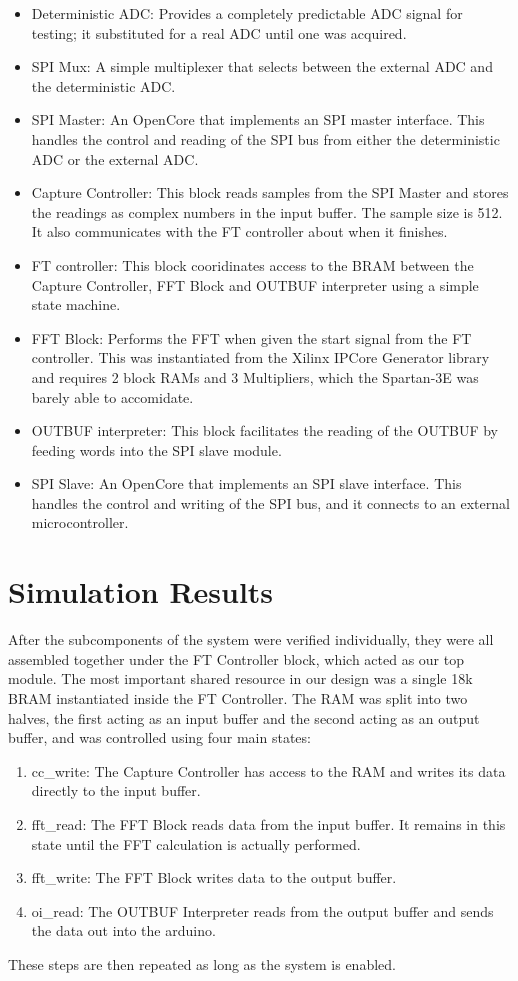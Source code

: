 \documentclass[12pt]{article}
\begin{document}
    \begin{itemize}
      \item Deterministic ADC: Provides a completely predictable ADC signal for testing; it substituted for a real ADC until one was acquired.
      \item SPI Mux: A simple multiplexer that selects between the external ADC and the deterministic ADC.
      \item SPI Master: An OpenCore that implements an SPI master interface. This handles the control and reading of the SPI bus from either the deterministic ADC or the external ADC.
      \item Capture Controller: This block reads samples from the SPI Master and stores the readings as complex numbers in the input buffer. The sample size is 512. It also communicates with the FT controller about when it finishes.
      \item FT controller: This block cooridinates access to the BRAM between the Capture Controller, FFT Block and OUTBUF interpreter using a simple state machine.
      \item FFT Block: Performs the FFT when given the start signal from the FT controller. This was instantiated from the Xilinx IPCore Generator library and requires 2 block RAMs and 3 Multipliers, which the Spartan-3E was barely able to accomidate.
      \item OUTBUF interpreter: This block facilitates the reading of the OUTBUF by feeding words into the SPI slave module.
      \item SPI Slave: An OpenCore that implements an SPI slave interface. This handles the control and writing of the SPI bus, and it connects to an external microcontroller.
    \end{itemize}

  \section*{Simulation Results}
    After the subcomponents of the system were verified individually, they were all assembled together under the FT Controller block, which acted as our top module.
    The most important shared resource in our design was a single 18k BRAM instantiated inside the FT Controller.
    The RAM was split into two halves, the first acting as an input buffer and the second acting as an output buffer, and was controlled using four main states: 
    \begin{enumerate}
      \item cc\_write: The Capture Controller has access to the RAM and writes its data directly to the input buffer.
      \item fft\_read: The FFT Block reads data from the input buffer.  It remains in this state until the FFT calculation is actually performed.
      \item fft\_write: The FFT Block writes data to the output buffer.
      \item oi\_read: The OUTBUF Interpreter reads from the output buffer and sends the data out into the arduino.
    \end{enumerate}
    These steps are then repeated as long as the system is enabled.\\
    
\end{document}
